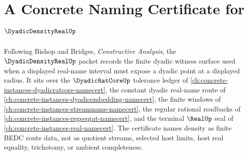 \chapter{A Concrete Naming Certificate for $\DyadicDensityRealUp$}
\label{ch:concrete-instances-dyadic-density-real-namecert}

Following Bishop and Bridges, \emph{Constructive Analysis}, the
$\DyadicDensityRealUp$ packet records the finite dyadic witness surface used
when a displayed real-name interval must expose a dyadic point at a displayed
radius. It sits over the $\DyadicRatCoreUp$ tolerance ledger of
\autoref{ch:concrete-instances-dyadicratcore-namecert}, the constant dyadic
real-name route of \autoref{ch:concrete-instances-dyadicembedding-namecert},
the finite windows of \autoref{ch:concrete-instances-streamname-namecert}, the
regular rational readbacks of
\autoref{ch:concrete-instances-regseqrat-namecert}, and the terminal
$\RealUp$ seal of \autoref{ch:concrete-instances-real-namecert}. The
certificate names density as finite BEDC route data, not as quotient streams,
selected host limits, host real equality, trichotomy, or ambient completeness.

